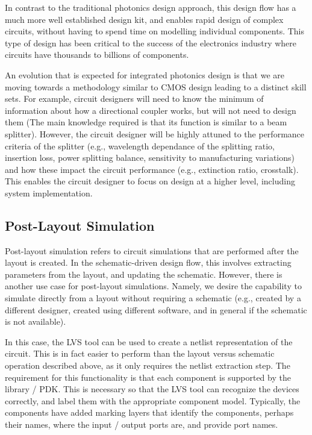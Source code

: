 \documentclass[journal]{spie}
\begin{document}
In contrast to the traditional photonics design approach, this design flow has a much more well established design kit, and enables rapid design of complex circuits, without having to spend time on modelling individual components.  This type of design has been critical to the success of the electronics industry where circuits have thousands to billions of components.

An evolution that is expected for integrated photonics design is that we are moving towards a methodology similar to CMOS design leading to a distinct skill sets.  For example, circuit designers will need to know the minimum of information about how a directional coupler works, but will not need to design them (The main knowledge required is that its function is similar to a beam splitter).  However, the circuit designer will be highly attuned to the performance criteria of the splitter (e.g., wavelength dependance of the splitting ratio, insertion loss, power splitting balance, sensitivity to manufacturing variations) and how these impact the circuit performance (e.g., extinction ratio, crosstalk).  This enables the circuit designer to focus on design at a higher level, including system implementation.


\subsection{Post-Layout Simulation}

Post-layout simulation refers to circuit simulations that are performed after the layout is created.  In the schematic-driven design flow, this involves extracting parameters from the layout, and updating the schematic.  However, there is another use case for post-layout simulations.  Namely, we desire the capability to simulate directly from a layout without requiring a schematic (e.g., created by a different designer,  created using different software, and in general if the schematic is not available).

In this case, the LVS tool can be used to create a netlist representation of the circuit.  This is in fact easier to perform than the layout versus schematic operation described above, as it only requires the netlist extraction step.  The requirement for this functionality is that each component is supported by the library / PDK.  This is necessary so that the LVS tool can recognize the devices correctly, and label them with the appropriate component model.  Typically, the components have added marking layers that identify the components, perhaps their names, where the input / output ports are, and provide port names.
\end{document}

